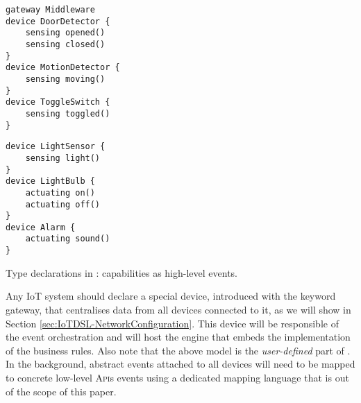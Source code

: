 \begin{table}
	\begin{minipage}[b]{.45\textwidth }%
		\begin{lstlisting}[language=iotdsl]	
gateway Middleware
device DoorDetector {
	sensing opened()
	sensing closed()
}
device MotionDetector {
	sensing moving()
}
device ToggleSwitch {
	sensing toggled()
}
		\end{lstlisting}
	\end{minipage}\hfill%
	\begin{minipage}[b]{.45\textwidth}
		\begin{lstlisting}[language=iotdsl, firstnumber=12]
device LightSensor {
	sensing light()
}
device LightBulb {
	actuating on()
	actuating off()
}	
device Alarm {
	actuating sound()
}
		\end{lstlisting}
		\vspace{.3cm}
	\end{minipage}
	\caption{Type declarations in \IOTDSL: capabilities as high-level events.}
	\label{lis:RE-TypeDeclarations}
\end{table}

Any IoT system should declare a special device, introduced with the keyword \textsf{gateway}, that centralises data from all devices connected to it, as we will show in Section \ref{sec:IoTDSL-NetworkConfiguration}. This device will be responsible of the event orchestration and will host the \CEP engine that embeds the implementation of the business rules. Also note that the above model is the \textit{user-defined} part of \IOTDSL. In the background, abstract events attached to all devices will need to be mapped to concrete low-level \textsc{Api}s events using a dedicated mapping language that is out of the scope of this paper.


